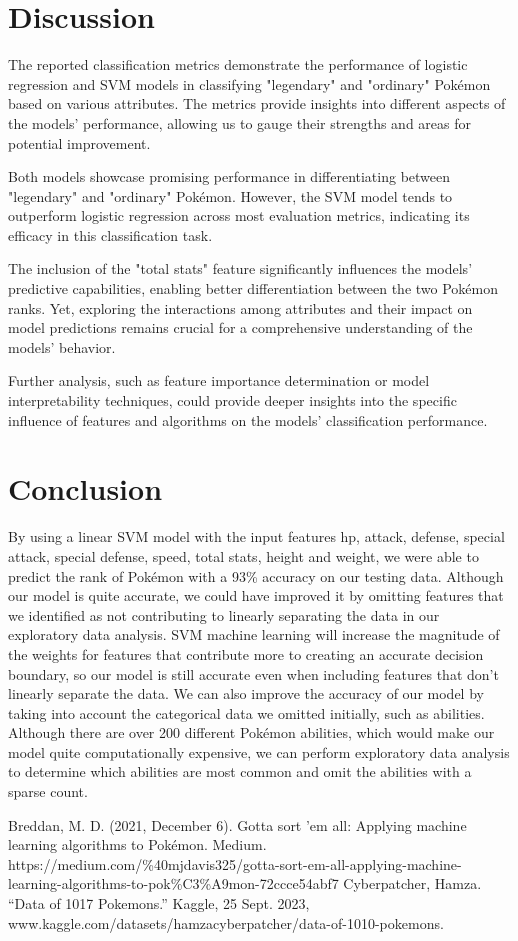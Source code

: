 \documentclass[conference]{IEEEtran}
\begin{document}
\section{Discussion}
The reported classification metrics demonstrate the performance of logistic regression and SVM models in classifying "legendary" and "ordinary" Pokémon based on various attributes. The metrics provide insights into different aspects of the models' performance, allowing us to gauge their strengths and areas for potential improvement.

Both models showcase promising performance in differentiating between "legendary" and "ordinary" Pokémon. However, the SVM model tends to outperform logistic regression across most evaluation metrics, indicating its efficacy in this classification task.

The inclusion of the "total stats" feature significantly influences the models' predictive capabilities, enabling better differentiation between the two Pokémon ranks. Yet, exploring the interactions among attributes and their impact on model predictions remains crucial for a comprehensive understanding of the models' behavior.

Further analysis, such as feature importance determination or model interpretability techniques, could provide deeper insights into the specific influence of features and algorithms on the models' classification performance.

\section{Conclusion}
By using a linear SVM model with the input features hp, attack, defense, special attack, special defense, speed, total stats, height and weight, we were able to predict the rank of Pokémon with a 93\% accuracy on our testing data. Although our model is quite accurate, we could have improved it by omitting features that we identified as not contributing to linearly separating the data in our exploratory data analysis. SVM machine learning will increase the magnitude of the weights for features that contribute more to creating an accurate decision boundary, so our model is still accurate even when including features that don't linearly separate the data. We can also improve the accuracy of our model by taking into account the categorical data we omitted initially, such as abilities. Although there are over 200 different Pokémon abilities, which would make our model quite computationally expensive, we can perform exploratory data analysis to determine which abilities are most common and omit the abilities with a sparse count. 

\begin{thebibliography}{00}
 Breddan, M. D. (2021, December 6). Gotta sort 'em all: Applying machine learning algorithms to Pokémon. Medium. https://medium.com/\%40mjdavis325/gotta-sort-em-all-applying-machine-learning-algorithms-to-pok\%C3\%A9mon-72ccce54abf7 
 Cyberpatcher, Hamza. “Data of 1017 Pokemons.” Kaggle, 25 Sept. 2023, www.kaggle.com/datasets/hamzacyberpatcher/data-of-1010-pokemons.
\end{thebibliography}
\end{document}
